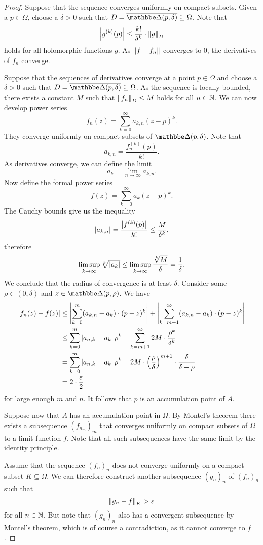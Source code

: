\begin{proof}
Suppose that the sequence converges uniformly on compact subsets.
Given a $p \in \Omega$, choose a $\delta > 0$ such that
$D = \oline{\dsk(p, \delta)} \subseteq \Omega$. Note that
\[
\left\lvert g^{(k)}(p)\right\rvert \leq \frac{k!}{\delta^k} \cdot \left\lVert g\right\rVert_D
\]
holds for all holomorphic functions $g$. As
$\left\lVert f - f_n\right\rVert$ converges to $0$, the derivatives of $f_n$
converge.

Suppose that the sequences of derivatives converge at a point
$p \in \Omega$ and choose a $\delta > 0$ such that
$D = \oline{\dsk(p, \delta)} \subseteq \Omega$. As the sequence is
locally bounded, there exists a constant $M$ such that
$\left\lVert f_n\right\rVert_D \leq M$ holds for all $n \in \mathbb{N}$. We can now develop
power series
\[
f_n(z) = \sum_{k=0}^\infty a_{k,n} (z-p)^k.
\]
They converge uniformly on compact subsets of $\dsk(p, \delta)$.
Note that
\[
a_{k,n} = \frac{f_n^{(k)}(p)}{k!}.
\]
As derivatives converge, we can define the limit
\[
a_k = \lim_{n \to \infty} a_{k,n}.
\]
Now define the formal power series
\[
f(z) = \sum_{k=0}^\infty a_k (z-p)^k.
\]
The Cauchy bounds give us the inequality
\[
\left\lvert a_{k,n}\right\rvert =
\frac{\left\lvert f^{(k)}(p)\right\rvert}{k!} \leq \frac{M}{\delta^k},
\]
therefore
\[
\limsup_{k \to \infty} \sqrt[k]{\left\lvert a_k\right\rvert} \leq
\limsup_{k \to \infty} \frac{\sqrt[k]{M}}{\delta} =
\frac{1}{\delta}.
\]
We conclude that the radius of convergence is at least $\delta$.
Consider some $\rho \in (0, \delta)$ and
$z \in \dsk(p, \rho)$. We have
\begin{align*}
\left\lvert f_n(z) - f(z)\right\rvert &\leq
\left\lvert \sum_{k=0}^m (a_{k,n} - a_k) \cdot (p-z)^k\right\rvert +
\left\lvert \sum_{k=m+1}^\infty (a_{k,n} - a_k) \cdot (p-z)^k\right\rvert
\\
&\leq
\sum_{k=0}^m \left\lvert a_{n,k} - a_k\right\rvert \rho^k +
\sum_{k=m+1}^\infty 2M \cdot \frac{\rho^k}{\delta^k}
\\
&=
\sum_{k=0}^m \left\lvert a_{n,k} - a_k\right\rvert \rho^k +
2M \cdot \left(\frac{\rho}{\delta}\right)^{m+1} \cdot
\frac{\delta}{\delta - \rho}
\\
&=
2 \cdot \frac{\varepsilon}{2}
\end{align*}
for large enough $m$ and $n$. It follows that $p$ is an
accumulation point of $A$.

Suppose now that $A$ has an accumulation point in $\Omega$. By
Montel's theorem there exists a subsequence $(f_{n_m})_m$ that
converges uniformly on compact subsets of $\Omega$ to a limit
function $f$. Note that all such subsequences have the same limit
by the identity principle.

Assume that the sequence $(f_n)_n$ does not converge uniformly on
a compact subset $K \subseteq \Omega$. We can therefore construct
another subsequence $(g_n)_n$ of $(f_n)_n$ such that
\[
\left\lVert g_n - f\right\rVert_K > \varepsilon
\]
for all $n \in \mathbb{N}$. But note that $(g_n)_n$ also has a convergent
subsequence by Montel's theorem, which is of course a
contradiction, as it cannot converge to $f$.
\end{proof}
